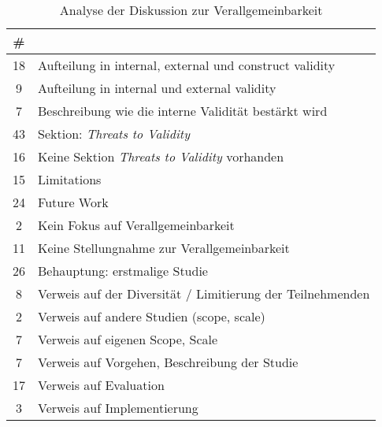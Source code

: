 \begin{table}[h!]
    \begin{tabular}{ c | p{14.5cm} }
        \# &  \\
        \hline
        18 & Aufteilung in internal, external und construct validity \\
        9  & Aufteilung in internal und external validity \\
        7 &  Beschreibung wie die interne Validität bestärkt wird \\
        \hline
        43 & Sektion: \textit{Threats to Validity} \\
        16 & Keine Sektion \textit{Threats to Validity} vorhanden\\
        \hline
        15 & Limitations \\
        24 & Future Work \\
        \hline
        2 &  Kein Fokus auf Verallgemeinbarkeit \\
        11 & Keine Stellungnahme zur Verallgemeinbarkeit \\
        26 & Behauptung: erstmalige Studie \\
        \hline
        8 & Verweis auf der Diversität / Limitierung der Teilnehmenden \\
        2 & Verweis auf andere Studien (scope, scale) \\
        7 & Verweis auf eigenen Scope, Scale \\
        7 & Verweis auf Vorgehen, Beschreibung der Studie \\
        17 & Verweis auf Evaluation \\
        3 & Verweis auf Implementierung \\
    \end{tabular}
    \caption{Analyse der Diskussion zur Verallgemeinbarkeit}
    \label{table:threats-of-validity}
\end{table}



